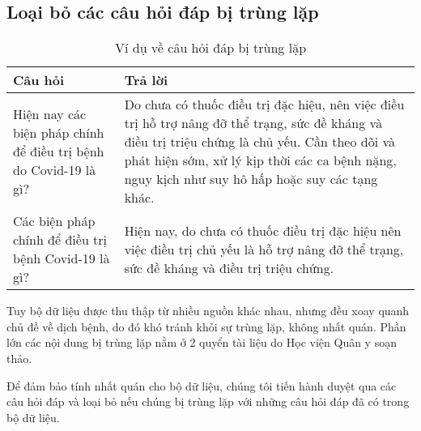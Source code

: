 \documentclass[runningheads]{llncs}
\begin{document}
\subsection{Loại bỏ các câu hỏi đáp bị trùng lặp}
\vspace{-0.4cm}
\begin{table}
	\setlength{\tabcolsep}{0.5em}
	\renewcommand{\arraystretch}{1.4}
	\begin{center}
	\caption{Ví dụ về câu hỏi đáp bị trùng lặp}\label{tab2}
		\begin{tabular}{ | p{5.75cm} | p{5.75cm} |} 
			\hline
    		\textbf{Câu hỏi} & \textbf{Trả lời}\\ 
			\hline
			Hiện nay các biện pháp chính để điều trị bệnh do Covid-19
			là gì?& Do chưa có thuốc điều trị đặc hiệu, nên việc điều trị hỗ trợ
			nâng đỡ thể trạng, sức đề kháng và điều trị triệu chứng là chủ
			yếu. Cần theo dõi và phát hiện sớm, xử lý kịp thời các ca
			bệnh nặng, nguy kịch như suy hô hấp hoặc suy các tạng khác.\\ 
			\hline
			Các biện pháp chính để điều trị bệnh Covid-19 là gì?& Hiện nay, do chưa có thuốc điều trị đặc hiệu nên việc điều trị chủ yếu là hỗ trợ nâng đỡ thể trạng, sức đề kháng và điều trị triệu chứng.\\
			\hline
			\end{tabular}
		\end{center}
\end{table}
\vspace{-0.8cm}
Tuy bộ dữ liệu được thu thập từ nhiều nguồn khác nhau, nhưng đều xoay quanh chủ đề về dịch bệnh,
 do đó khó tránh khỏi sự trùng lặp, không nhất quán. Phần lớn các nội dung bị trùng lặp nằm ở 2 quyển tài liệu do Học viện Quân y soạn thảo.

Để đảm bảo tính nhất quán cho bộ dữ liệu, chúng tôi tiến hành duyệt qua các câu hỏi đáp và loại bỏ nếu chúng bị trùng lặp với những câu hỏi đáp đã có trong bộ dữ liệu.
\end{document}
